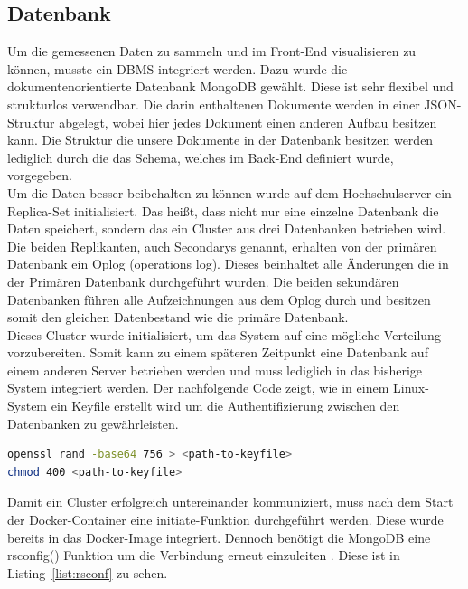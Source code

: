 \documentclass{article}
\begin{document}
\subsection{Datenbank}
Um die gemessenen Daten zu sammeln und im Front-End visualisieren zu können, musste ein DBMS integriert werden. 
Dazu wurde die dokumentenorientierte Datenbank MongoDB gewählt. Diese ist sehr flexibel und strukturlos verwendbar. 
Die darin enthaltenen Dokumente werden in einer JSON-Struktur abgelegt, wobei hier jedes Dokument einen anderen Aufbau besitzen kann. 
Die Struktur die unsere Dokumente in der Datenbank besitzen werden lediglich durch die das Schema, welches im Back-End definiert wurde, vorgegeben\cite[3-5]{Hows.2015}. \\

Um die Daten besser beibehalten zu können wurde auf dem Hochschulserver ein Replica-Set initialisiert. 
Das heißt, dass nicht nur eine einzelne Datenbank die Daten speichert, sondern das ein Cluster aus drei Datenbanken betrieben wird. 
Die beiden Replikanten, auch Secondarys genannt, erhalten von der primären Datenbank ein Oplog (operations log). 
Dieses beinhaltet alle Änderungen die in der Primären Datenbank durchgeführt wurden. 
Die beiden sekundären Datenbanken führen alle Aufzeichnungen aus dem Oplog durch und besitzen somit den gleichen Datenbestand wie die primäre Datenbank\cite[289-291]{Hows.2015}.\\

Dieses Cluster wurde initialisiert, um das System auf eine mögliche Verteilung vorzubereiten. 
Somit kann zu einem späteren Zeitpunkt eine Datenbank auf einem anderen Server betrieben werden und muss lediglich in das bisherige System integriert werden. 
Der nachfolgende Code zeigt, wie in einem Linux-System ein Keyfile erstellt wird um die Authentifizierung zwischen den Datenbanken zu gewährleisten.\\
\begin{lstlisting}[language=Bash, caption=Erstellen eines Keyfiles]
openssl rand -base64 756 > <path-to-keyfile>
chmod 400 <path-to-keyfile>
\end{lstlisting}

Damit ein Cluster erfolgreich untereinander kommuniziert, muss nach dem Start der Docker-Container eine initiate-Funktion durchgeführt werden. 
Diese wurde bereits in das Docker-Image integriert.
Dennoch benötigt die MongoDB eine rsconfig() Funktion um die Verbindung erneut einzuleiten \cite[304-306]{giamas2019mastering}.
Diese ist in Listing~\ref{list:rsconf} zu sehen.
\end{document}
